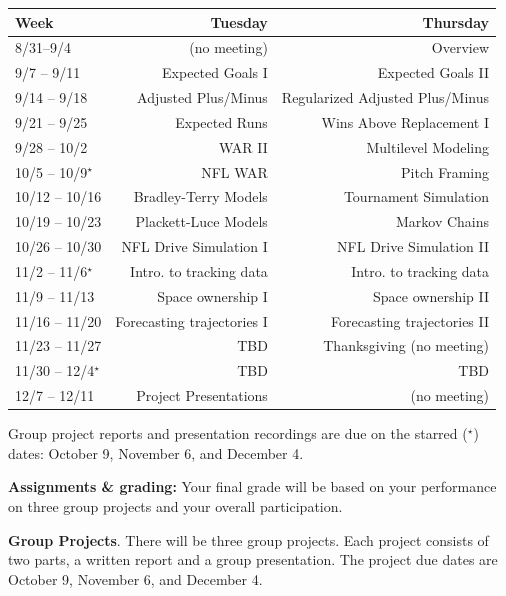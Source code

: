 \documentclass[11pt]{article}
\begin{document}
\begin{table}[h]
\centering
{\small
\begin{tabular}{lrr} \hline
Week & Tuesday & Thursday  \\ \hline
8/31--9/4 & (no meeting) & Overview  \\
9/7 -- 9/11 & Expected Goals I & Expected Goals II \\ 
9/14 -- 9/18 & Adjusted Plus/Minus & Regularized Adjusted Plus/Minus \\
9/21 -- 9/25 & Expected Runs & Wins Above Replacement I \\
9/28 -- 10/2 & WAR II & Multilevel Modeling  \\ %
10/5 -- 10/9$^{\star}$ & NFL WAR  & Pitch Framing  \\ 
10/12 -- 10/16 & Bradley-Terry Models & Tournament Simulation \\
10/19 -- 10/23 & Plackett-Luce Models & Markov Chains  \\  %
10/26 -- 10/30 & NFL Drive Simulation I & NFL Drive Simulation II \\ %
11/2 -- 11/6$^{\star}$ & Intro. to tracking data & Intro. to tracking data \\ %
11/9 -- 11/13 & Space ownership I & Space ownership II \\  %
11/16 -- 11/20 & Forecasting trajectories I & Forecasting trajectories II \\
11/23 -- 11/27 & TBD & Thanksgiving (no meeting) \\
11/30 -- 12/4$^{\star}$ & TBD & TBD  \\
12/7 -- 12/11 & Project Presentations & (no meeting) \\ \hline
\end{tabular}
}
\end{table}
Group project reports and presentation recordings are due on the starred ($^{\star}$) dates: October 9, November 6, and December 4.

\textbf{Assignments \& grading:} Your final grade will be based on your performance on three group projects and your overall participation.

\textbf{Group Projects}. There will be three group projects. Each project consists of two parts, a written report and a group presentation. The project due dates are October 9, November 6, and December 4.
\end{document}
